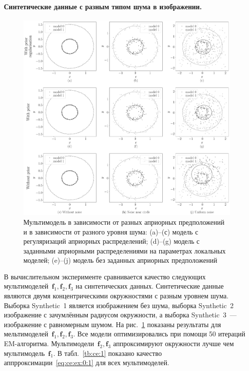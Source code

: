 \paragraph{Синтетические данные с разным типом шума в изображении.}
\begin{figure}[h!t]\center
\includegraphics[width=1\textwidth]{results/priorexpert/experiment_synthetic}
\caption{Мультимодель в зависимости от разных априорных предположений и в зависимости от разного уровня шума: (a)--(с) модель с регуляризаций априорных распределений; (d)--(g) модель с заданными априорными распределениями на параметрах локальных моделей; (e)--(j) модель без заданных априорных предположений}
\label{experiment:1}
\end{figure}
В вычислительном эксперименте сравнивается качество следующих мультимоделей~$\textbf{f}_1, \textbf{f}_2, \textbf{f}_3$ на синтетических данных.
Синтетические данные являются двумя концентрическими окружностями с разным уровнем шума.
Выборка Synthetic~1 является изображением без шума, выборка Synthetic~2 изображение с зачумлённым радиусом окружности, а выборка Synthetic~3~--- изображение с равномерным шумом.
На рис.~\ref{experiment:1} показаны результаты для мельтимоделей~$\textbf{f}_1, \textbf{f}_2, \textbf{f}_3$.
Все модели оптимизировались при помощи 50 итераций EM-алгоритма.
Мультимодели~$\textbf{f}_2, \textbf{f}_3$ аппроксимируют окружности лучше чем мультимодель~$\textbf{f}_1$. В табл.~\ref{tb:ce:1} показано качество аппрроксимации~\eqref{eq:ce:ex:0:1} для всех мультимоделей.

